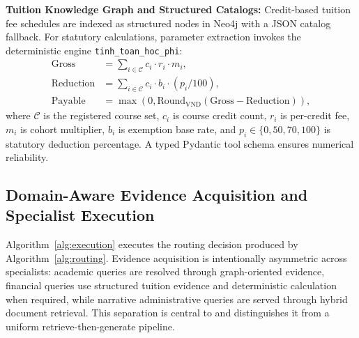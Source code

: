 \textbf{Tuition Knowledge Graph and Structured Catalogs:} Credit-based tuition fee schedules are indexed as structured nodes in Neo4j with a JSON catalog fallback. For statutory calculations, parameter extraction invokes the deterministic engine \texttt{tinh\_toan\_hoc\_phi}:
\begin{align}
  \mathrm{Gross} &= \textstyle\sum_{i \in \mathcal{C}} c_i \cdot r_i \cdot m_i, \label{eq:gross_fee} \\
  \mathrm{Reduction} &= \textstyle\sum_{i \in \mathcal{C}} c_i \cdot b_i \cdot (p_i / 100), \label{eq:reduction_fee} \\
  \mathrm{Payable} &= \max\left(0, \mathrm{Round}_{\text{VND}}(\mathrm{Gross} - \mathrm{Reduction})\right), \label{eq:payable_fee}
\end{align}
where $\mathcal{C}$ is the registered course set, $c_i$ is course credit count, $r_i$ is per-credit fee, $m_i$ is cohort multiplier, $b_i$ is exemption base rate, and $p_i \in \{0, 50, 70, 100\}$ is statutory deduction percentage. A typed Pydantic tool schema ensures numerical reliability.

\subsection{Domain-Aware Evidence Acquisition and Specialist Execution}
\label{sec:execution_mechanism}

Algorithm~\ref{alg:execution} executes the routing decision produced by Algorithm~\ref{alg:routing}. Evidence acquisition is intentionally asymmetric across specialists: academic queries are resolved through graph-oriented evidence, financial queries use structured tuition evidence and deterministic calculation when required, while narrative administrative queries are served through hybrid document retrieval. This separation is central to \system{} and distinguishes it from a uniform retrieve-then-generate pipeline.

